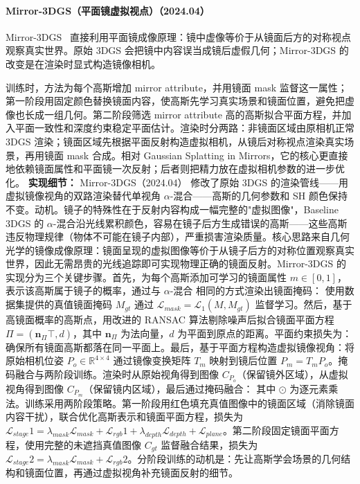 \paragraph{Mirror-3DGS（平面镜虚拟视点）（2024.04）}
Mirror-3DGS~\cite{2404_01168} 直接利用平面镜成像原理：镜中虚像等价于从镜面后方的对称视点观察真实世界。原始 3DGS 会把镜中内容误当成镜后虚假几何；Mirror-3DGS 的改变是在渲染时显式构造镜像相机。

训练时，方法为每个高斯增加 mirror attribute，并用镜面 mask 监督这一属性；第一阶段用固定颜色替换镜面内容，使高斯先学习真实场景和镜面位置，避免把虚像也长成一组几何。第二阶段筛选 mirror attribute 高的高斯拟合平面方程，并加入平面一致性和深度约束稳定平面估计。渲染时分两路：非镜面区域由原相机正常 3DGS 渲染；镜面区域先根据平面反射构造虚拟相机，从镜后对称视点渲染真实场景，再用镜面 mask 合成。相对 Gaussian Splatting in Mirrors，它的核心更直接地依赖镜面属性和平面镜一次反射；后者则把精力放在虚拟相机参数的进一步优化。
\textbf{实现细节：} Mirror-3DGS（2024.04） 修改了原始 3DGS 的渲染管线——用虚拟镜像视角的双路渲染替代单视角 $\alpha$-混合——高斯的几何参数和 SH 颜色保持不变。动机。镜子的特殊性在于反射内容构成一幅完整的"虚拟图像"，Baseline 3DGS 的 $\alpha$-混合沿光线累积颜色，容易在镜子后方生成错误的高斯——这些高斯违反物理规律（物体不可能在镜子内部），严重损害渲染质量。核心思路来自几何光学的镜像成像原理：镜面呈现的虚拟图像等价于从镜子后方的对称位置观察真实世界，因此无需昂贵的光线追踪即可实现物理正确的镜面反射。Mirror-3DGS 的实现分为三个关键步骤。首先，为每个高斯添加可学习的镜面属性 $m \in [0,1]$，表示该高斯属于镜子的概率，通过与 $\alpha$-混合 相同的方式渲染出镜面掩码： 使用数据集提供的真值镜面掩码 $M_{gt}$ 通过 $\mathcal{L}_{mask} = \mathcal{L}_1(M, M_{gt})$ 监督学习。然后，基于高镜面概率的高斯点，用改进的 RANSAC 算法剔除噪声后拟合镜面平面方程 $\Pi = (\mathbf{n}_\Pi^{}\top, d)$，其中 $\mathbf{n}_\Pi$ 为法向量，$d$ 为平面到原点的距离。平面约束损失为： 确保所有镜面高斯都落在同一平面上。最后，基于平面方程构造虚拟镜像视角：将原始相机位姿 $P_o \in \mathbb{R}^{4 \times 4}$ 通过镜像变换矩阵 $T_m$ 映射到镜后位置 $P_m = T_m P_o$。掩码融合与两阶段训练。渲染时从原始视角得到图像 $C_{P_o}$（保留镜外区域），从虚拟视角得到图像 $C_{P_m}$（保留镜内区域），最后通过掩码融合： 其中 $\odot$ 为逐元素乘法。训练采用两阶段策略。第一阶段用红色填充真值图像中的镜面区域（消除镜面内容干扰），联合优化高斯表示和镜面平面方程，损失为 $\mathcal{L}_{stage}^{}1 = \lambda_{mask}\mathcal{L}_{mask} + \mathcal{L}_{rgb}^{}1 + \lambda_{depth}\mathcal{L}_{depth} + \mathcal{L}_{plane}$。第二阶段固定镜面平面方程，使用完整的未遮挡真值图像 $C_{gt}$ 监督融合结果，损失为 $\mathcal{L}_{stage}^{}2 = \lambda_{mask}\mathcal{L}_{mask} + \mathcal{L}_{rgb}^{}2$。分阶段训练的动机是：先让高斯学会场景的几何结构和镜面位置，再通过虚拟视角补充镜面反射的细节。
